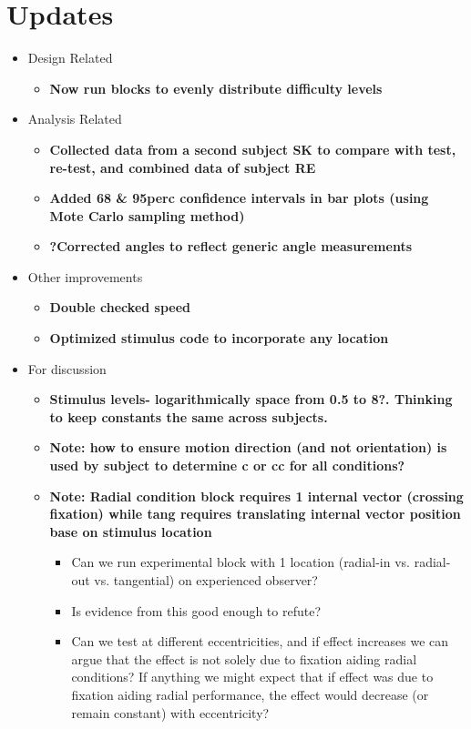 \documentclass[11pt]{article} %
\begin{document}
\newpage
\section{Updates} 
\begin{itemize}
\item Design Related
	\begin{itemize}
	\item \textbf{Now run blocks to evenly distribute difficulty levels}
	\end{itemize}
\item Analysis Related
	\begin{itemize}
	\item \textbf{Collected data from a second subject SK to compare with test, re-test, and combined data of subject RE}
	\item \textbf{Added 68 \& 95perc confidence intervals in bar plots (using Mote Carlo sampling method)}
	\item \textbf{?Corrected angles to reflect generic angle measurements}
	\end{itemize}
\item Other improvements
	\begin{itemize}
	\item \textbf{Double checked speed}
	\item \textbf{Optimized stimulus code to incorporate any location}
	\end{itemize}
\item For discussion
	\begin{itemize}
	\item \textbf{Stimulus levels- logarithmically space from 0.5 to 8?. Thinking to keep constants the same across subjects.}
	\item \textbf{Note: how to ensure motion direction (and not orientation) is used by subject to determine c or cc for all conditions?}
	\item \textbf{Note: Radial condition block requires 1 internal vector (crossing fixation) while tang requires translating internal vector position base on stimulus location}
		\begin{itemize}
			\item{Can we run experimental block with 1 location (radial-in vs. radial-out vs. tangential) on experienced observer?}
			\item{Is evidence from this good enough to refute?}
			\item{Can we test at different eccentricities, and if effect increases we can argue that the effect is not solely due to fixation aiding radial conditions? If anything we might expect that if effect was due to fixation aiding radial performance, the effect would decrease (or remain constant) with eccentricity?}
		\end{itemize}
	\end{itemize}
\end{itemize}
\end{document}
